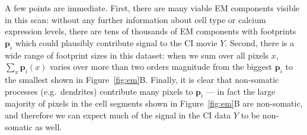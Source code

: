 \documentclass[10pt,letterpaper]{article}
\begin{document}
{A few points are immediate.  First, there are many viable EM components visible in this scan: without any further information about cell type or calcium expression levels, there are tens of thousands of EM components with footprints $\bm{p}_i$ which could plausibly contribute signal to the CI movie $Y$.  Second, there is a wide range of footprint sizes in this dataset: when we sum over all pixels $x$, $\sum_x \bm{p}_i(x)$ varies over more than two orders magnitude from the biggest $\bm{p}_i$ to the smallest shown in Figure~\ref{fig:em}B.  Finally, it is clear that non-somatic processes (e.g.~dendrites) contribute many pixels to $\bm{p}_i$ --- in fact the large majority of pixels in the cell segments shown in Figure~\ref{fig:em}B are non-somatic, and therefore we can expect much of the signal in the CI data $Y$ to be non-somatic as well.




}
\end{document}

